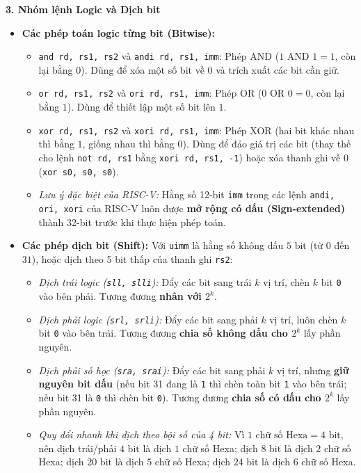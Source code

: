 \textbf{3. Nhóm lệnh Logic và Dịch bit}
\begin{itemize}
    \item \textbf{Các phép toán logic từng bit (Bitwise):}
    \begin{itemize}
        \item \texttt{and rd, rs1, rs2} và \texttt{andi rd, rs1, imm}: Phép AND ($1\text{ AND }1 = 1$, còn lại bằng $0$). Dùng để xóa một số bit về $0$ và trích xuất các bit cần giữ.
        \item \texttt{or rd, rs1, rs2} và \texttt{ori rd, rs1, imm}: Phép OR ($0\text{ OR }0 = 0$, còn lại bằng $1$). Dùng để thiết lập một số bit lên $1$.
        \item \texttt{xor rd, rs1, rs2} và \texttt{xori rd, rs1, imm}: Phép XOR (hai bit khác nhau thì bằng $1$, giống nhau thì bằng $0$). Dùng để đảo giá trị các bit (thay thế cho lệnh \texttt{not rd, rs1} bằng \texttt{xori rd, rs1, -1}) hoặc xóa thanh ghi về $0$ (\texttt{xor s0, s0, s0}).
        \item \textit{Lưu ý đặc biệt của RISC-V:} Hằng số 12-bit \texttt{imm} trong các lệnh \texttt{andi, ori, xori} của RISC-V luôn được \textbf{mở rộng có dấu (Sign-extended)} thành 32-bit trước khi thực hiện phép toán.
    \end{itemize}
    \item \textbf{Các phép dịch bit (Shift):} Với \texttt{uimm} là hằng số không dấu $5\text{ bit}$ (từ $0$ đến $31$), hoặc dịch theo 5 bit thấp của thanh ghi \texttt{rs2}:
    \begin{itemize}
        \item \textit{Dịch trái logic (\texttt{sll, slli}):} Đẩy các bit sang trái $k$ vị trí, chèn $k$ bit \texttt{0} vào bên phải. Tương đương \textbf{nhân với $2^k$}.
        \item \textit{Dịch phải logic (\texttt{srl, srli}):} Đẩy các bit sang phải $k$ vị trí, luôn chèn $k$ bit \texttt{0} vào bên trái. Tương đương \textbf{chia số không dấu cho $2^k$} lấy phần nguyên.
        \item \textit{Dịch phải số học (\texttt{sra, srai}):} Đẩy các bit sang phải $k$ vị trí, nhưng \textbf{giữ nguyên bit dấu} (nếu bit 31 đang là \texttt{1} thì chèn toàn bit \texttt{1} vào bên trái; nếu bit 31 là \texttt{0} thì chèn bit \texttt{0}). Tương đương \textbf{chia số có dấu cho $2^k$} lấy phần nguyên.
        \item \textit{Quy đổi nhanh khi dịch theo bội số của 4 bit:} Vì $1\text{ chữ số Hexa} = 4\text{ bit}$, nên dịch trái/phải $4\text{ bit}$ là dịch $1$ chữ số Hexa; dịch $8\text{ bit}$ là dịch $2$ chữ số Hexa; dịch $20\text{ bit}$ là dịch $5$ chữ số Hexa; dịch $24\text{ bit}$ là dịch $6$ chữ số Hexa.
    \end{itemize}
\end{itemize}

